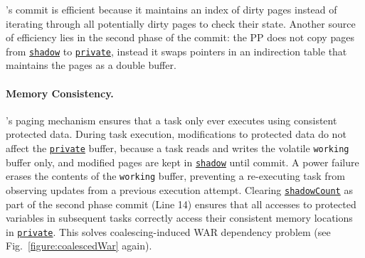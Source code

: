 \sys's commit is efficient because it maintains an index of dirty pages instead of iterating through all potentially dirty pages to check their state.
Another source of efficiency lies in the second phase of the commit:
the PP does not copy pages from \texttt{\underline{shadow}} to \texttt{\underline{private}}, instead it swaps pointers in an indirection table that maintains the pages as a double buffer.

\paragraph{Memory Consistency.}
\sys's paging mechanism ensures that a task only ever executes using consistent protected data. During task execution, modifications to protected data do not affect the \texttt{\underline{private}} buffer, because a task reads and writes the volatile \texttt{working} buffer only, and modified pages are kept in \texttt{\underline{shadow}} until commit. A power failure erases the contents of the \texttt{working} buffer, preventing a re-executing task from observing updates from a previous execution attempt. Clearing \texttt{\underline{shadowCount}} as part of the second phase commit (Line 14) ensures that all accesses to protected variables in subsequent tasks correctly access their consistent memory locations in \texttt{\underline{private}}. This solves coalescing-induced WAR dependency problem (see Fig.~\ref{figure:coalescedWar} again).

